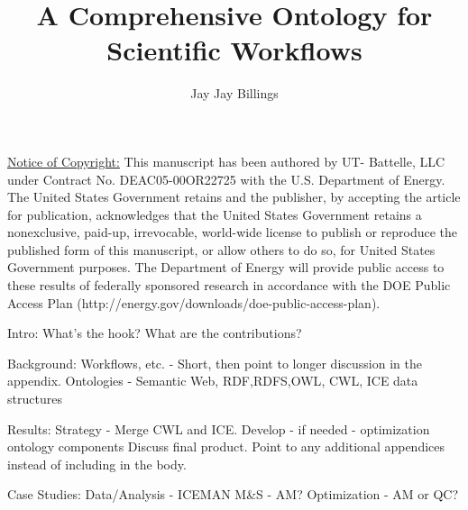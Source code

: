 \documentclass[sigconf]{acmart}
\begin{document}
\title{A Comprehensive Ontology for Scientific Workflows}

\author{Jay Jay Billings}


\begin{abstract}


\end{abstract}

\maketitle

\underline{Notice of Copyright:} This manuscript has been authored by UT-
Battelle, LLC under Contract No. DEAC05-00OR22725 with the U.S. Department of
Energy. The United States Government retains and the publisher, by accepting
the article for publication, acknowledges that the United States Government
retains a nonexclusive, paid-up, irrevocable, world-wide license to publish or
reproduce the published form of this manuscript, or allow others to do so, for
United States Government purposes. The Department of Energy will provide
public access to these results of federally sponsored research in accordance
with the DOE Public Access Plan (http://energy.gov/downloads/doe-public-access-plan).

Intro:
What's the hook?
What are the contributions?

Background:
Workflows, etc. - Short, then point to longer discussion in the appendix.
Ontologies - Semantic Web, {RDF,RDFS,OWL}, CWL, ICE data structures

Results:
Strategy - Merge CWL and ICE. Develop - if needed - optimization ontology components
Discuss final product. Point to any additional appendices instead of including in the body.

Case Studies:
Data/Analysis - ICEMAN
M&S - AM?
Optimization - AM or QC?






\end{document}
